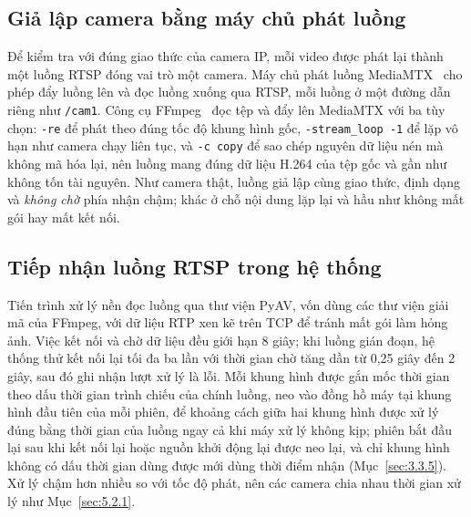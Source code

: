 \subsection{Giả lập camera bằng máy chủ phát luồng}
\label{sec:3.7.3}

Để kiểm tra với đúng giao thức của camera IP, mỗi video được phát lại thành một luồng RTSP đóng vai trò một camera. Máy chủ phát luồng MediaMTX~\cite{mediamtx2026} cho phép đẩy luồng lên và đọc luồng xuống qua RTSP, mỗi luồng ở một đường dẫn riêng như \texttt{/cam1}. Công cụ FFmpeg~\cite{ffmpeg2026docs} đọc tệp và đẩy lên MediaMTX với ba tùy chọn: \texttt{-re} để phát theo đúng tốc độ khung hình gốc, \texttt{-stream\_loop -1} để lặp vô hạn như camera chạy liên tục, và \texttt{-c copy} để sao chép nguyên dữ liệu nén mà không mã hóa lại, nên luồng mang đúng dữ liệu H.264 của tệp gốc và gần như không tốn tài nguyên. Như camera thật, luồng giả lập cùng giao thức, định dạng và \emph{không chờ} phía nhận chậm; khác ở chỗ nội dung lặp lại và hầu như không mất gói hay mất kết nối.

\subsection{Tiếp nhận luồng RTSP trong hệ thống}
\label{sec:3.7.4}

Tiến trình xử lý nền đọc luồng qua thư viện PyAV, vốn dùng các thư viện giải mã của FFmpeg, với dữ liệu RTP xen kẽ trên TCP để tránh mất gói làm hỏng ảnh. Việc kết nối và chờ dữ liệu đều giới hạn 8 giây; khi luồng gián đoạn, hệ thống thử kết nối lại tối đa ba lần với thời gian chờ tăng dần từ 0,25 giây đến 2 giây, sau đó ghi nhận lượt xử lý là lỗi. Mỗi khung hình được gắn mốc thời gian theo dấu thời gian trình chiếu của chính luồng, neo vào đồng hồ máy tại khung hình đầu tiên của mỗi phiên, để khoảng cách giữa hai khung hình được xử lý đúng bằng thời gian của luồng ngay cả khi máy xử lý không kịp; phiên bắt đầu lại sau khi kết nối lại hoặc nguồn khởi động lại được neo lại, và chỉ khung hình không có dấu thời gian dùng được mới dùng thời điểm nhận (Mục~\ref{sec:3.3.5}). Xử lý chậm hơn nhiều so với tốc độ phát, nên các camera chia nhau thời gian xử lý như Mục~\ref{sec:5.2.1}.
